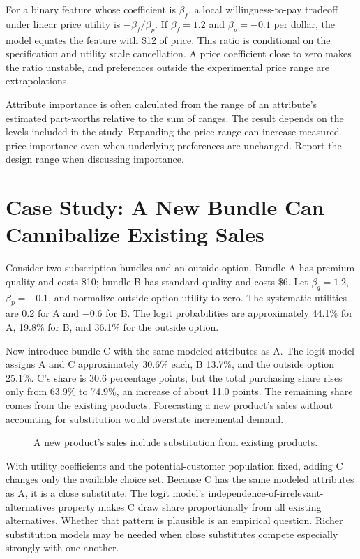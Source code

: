 For a binary feature whose coefficient is \(\beta_f\), a local
willingness-to-pay tradeoff under linear price utility is
\(-\beta_f/\beta_p\). If \(\beta_f=1.2\) and \(\beta_p=-0.1\) per
dollar, the model equates the feature with \$12 of price. This ratio is
conditional on the specification and utility scale cancellation. A price
coefficient close to zero makes the ratio unstable, and preferences
outside the experimental price range are extrapolations.

Attribute importance is often calculated from the range of an
attribute's estimated part-worths relative to the sum of ranges. The
result depends on the levels included in the study. Expanding the price
range can increase measured price importance even when underlying
preferences are unchanged. Report the design range when discussing
importance.

\hypertarget{M04-case-study-a-new-bundle-can-cannibalize-existing-sales}{%
\section{Case Study: A New Bundle Can Cannibalize Existing
Sales}\label{M04-case-study-a-new-bundle-can-cannibalize-existing-sales}}

\noindent Consider two subscription bundles and an outside option. Bundle A has
premium quality and costs \$10; bundle B has standard quality and costs
\$6. Let \(\beta_q=1.2\), \(\beta_p=-0.1\), and normalize outside-option
utility to zero. The systematic utilities are 0.2 for A and \(-0.6\) for
B. The logit probabilities are approximately 44.1\% for A, 19.8\% for B,
and 36.1\% for the outside option.

Now introduce bundle C with the same modeled attributes as A. The logit
model assigns A and C approximately 30.6\% each, B 13.7\%, and the
outside option 25.1\%. C's share is 30.6 percentage points, but the
total purchasing share rises only from 63.9\% to 74.9\%, an increase of
about 11.0 points. The remaining share comes from the existing products.
Forecasting a new product's sales without accounting for substitution
would overstate incremental demand.

\begin{figure}[htbp]
\centering

\caption{A new product’s sales include substitution from existing products.}\label{fig:M04_cannibalization}
\end{figure}

With utility coefficients and the potential-customer population fixed,
adding C changes only the available choice set. Because C has the same
modeled attributes as A, it is a close substitute. The logit model's
independence-of-irrelevant-alternatives property makes C draw share
proportionally from all existing alternatives. Whether that pattern is
plausible is an empirical question. Richer substitution models may be
needed when close substitutes compete especially strongly with one
another.

